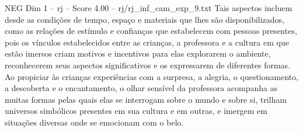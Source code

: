\begin{textsample}{NEG Dim 1 – rj – Score 4.00 – rj/rj\_inf\_cam\_exp\_9.txt}
Tais aspectos incluem desde as condições de tempo, espaço e materiais que lhes são disponibilizados, como as relações de estímulo e confianças que estabelecem com pessoas presentes, pois os vínculos estabelecidos entre as crianças, a professora e a cultura em que estão imersos criam motivos e incentivos para elas explorarem o ambiente, reconhecerem seus aspectos significativos e os expressarem de diferentes formas.
Ao propiciar às crianças experiências com a surpresa, a alegria, o questionamento, a descoberta e o encantamento, o olhar sensível da professora acompanha as muitas formas pelas quais elas se interrogam sobre o mundo e sobre si, trilham universos simbólicos presentes em sua cultura e em outras, e imergem em situações diversas onde se emocionam com o belo.

\end{textsample}
